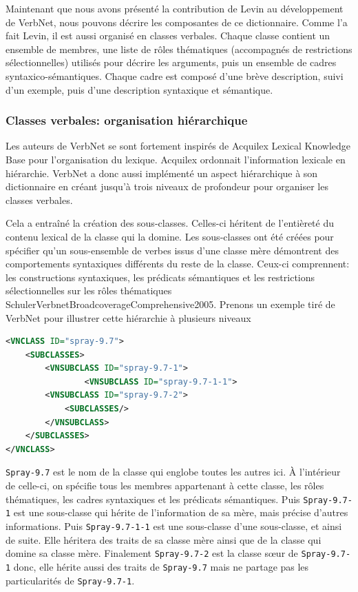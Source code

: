 Maintenant que nous avons présenté la contribution de Levin au développement de VerbNet, nous pouvons décrire les composantes de ce dictionnaire. Comme l'a fait Levin, il est aussi organisé en classes verbales. Chaque classe contient un ensemble de membres, une liste de rôles thématiques (accompagnés de restrictions sélectionnelles) utilisés pour décrire les arguments, puis un ensemble de cadres syntaxico-sémantiques. Chaque cadre est composé d'une brève description, suivi d'un exemple, puis d'une description syntaxique et sémantique\citep{SchulerVerbnetBroadcoverageComprehensive2005}.

\subsubsection{Classes verbales: organisation hiérarchique}

Les auteurs de VerbNet se sont fortement inspirés de Acquilex Lexical Knowledge Base \citep{CopestakeACQUILEXLKBrepresentation1992} pour l'organisation du lexique. Acquilex ordonnait l'information lexicale en hiérarchie. VerbNet a donc aussi implémenté un aspect hiérarchique à son dictionnaire en créant jusqu'à trois niveaux de profondeur pour organiser les classes verbales. 

Cela a entraîné la création des sous-classes. Celles-ci héritent de l'entièreté du contenu lexical de la classe qui la domine. Les sous-classes ont été créées pour spécifier qu'un sous-ensemble de verbes issus d'une classe mère démontrent des comportements syntaxiques différents du reste de la classe. Ceux-ci comprennent: les constructions syntaxiques, les prédicats sémantiques et les restrictions sélectionnelles sur les rôles thématiques {SchulerVerbnetBroadcoverageComprehensive2005}. Prenons un exemple tiré de VerbNet pour illustrer cette hiérarchie à plusieurs niveaux 

\begin{lstlisting}[language=XML, caption = Hiérarchie, label=hierarch]
<VNCLASS ID="spray-9.7">
    <SUBCLASSES>
        <VNSUBCLASS ID="spray-9.7-1">
                <VNSUBCLASS ID="spray-9.7-1-1">
        <VNSUBCLASS ID="spray-9.7-2">
            <SUBCLASSES/>
        </VNSUBCLASS>
    </SUBCLASSES>
</VNCLASS>
\end{lstlisting}

\texttt{Spray-9.7} est le nom de la classe qui englobe toutes les autres ici. À l'intérieur de celle-ci, on spécifie tous les membres appartenant à cette classe, les rôles thématiques, les cadres syntaxiques et les prédicats sémantiques. Puis \texttt{Spray-9.7-1} est une sous-classe qui hérite de l'information de sa mère, mais précise d'autres informations.  Puis \texttt{Spray-9.7-1-1} est une sous-classe d'une sous-classe, et ainsi de suite. Elle héritera des traits de sa classe mère ainsi que de la classe qui domine sa classe mère. Finalement \texttt{Spray-9.7-2} est la classe sœur de \texttt{Spray-9.7-1} donc, elle hérite aussi des traits de \texttt{Spray-9.7} mais ne partage pas les particularités de \texttt{Spray-9.7-1}.

